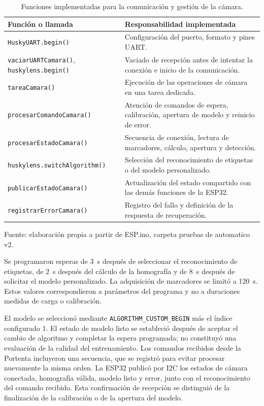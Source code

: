 \begin{table}[H]
    \centering\small
    \caption{Funciones implementadas para la comunicación y gestión de la cámara.}
    \label{tab:fase5_comunicacion}
    \begin{tabular}{p{}p{}}
        \hline
        Función o llamada & Responsabilidad implementada \\
        \hline
        \texttt{HuskyUART.begin()} & Configuración del puerto, formato y pines UART. \\
        \texttt{vaciarUARTCamara()}, \texttt{huskylens.begin()} & Vaciado de recepción antes de intentar la conexión e inicio de la comunicación. \\
        \texttt{tareaCamara()} & Ejecución de las operaciones de cámara en una tarea dedicada. \\
        \texttt{procesarComandoCamara()} & Atención de comandos de espera, calibración, apertura de modelo y reinicio de error. \\
        \texttt{procesarEstadoCamara()} & Secuencia de conexión, lectura de marcadores, cálculo, apertura y detección. \\
        \texttt{huskylens.switchAlgorithm()} & Selección del reconocimiento de etiquetas o del modelo personalizado. \\
        \texttt{publicarEstadoCamara()} & Actualización del estado compartido con las demás funciones de la ESP32. \\
        \texttt{registrarErrorCamara()} & Registro del fallo y definición de la respuesta de recuperación. \\
        \hline
    \end{tabular}
    \par\small\raggedright Fuente: elaboración propia a partir de ESP.ino, carpeta pruebas de automatico v2.
\end{table}

Se programaron esperas de 3~s después de seleccionar el reconocimiento de etiquetas, de 2~s después del cálculo de la homografía y de 8~s después de solicitar el modelo personalizado. La adquisición de marcadores se limitó a 120~s. Estos valores correspondieron a parámetros del programa y no a duraciones medidas de carga o calibración.

El modelo se seleccionó mediante \texttt{ALGORITHM\_CUSTOM\_BEGIN} más el índice configurado 1. El estado de modelo listo se estableció después de aceptar el cambio de algoritmo y completar la espera programada; no constituyó una evaluación de la calidad del entrenamiento. Los comandos recibidos desde la Portenta incluyeron una secuencia, que se registró para evitar procesar nuevamente la misma orden. La ESP32 publicó por I2C los estados de cámara conectada, homografía válida, modelo listo y error, junto con el reconocimiento del comando recibido. Esta confirmación de recepción se distinguió de la finalización de la calibración o de la apertura del modelo.

